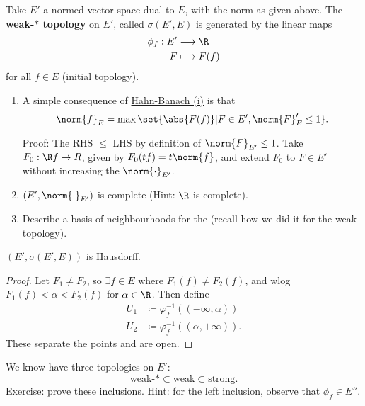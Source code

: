\documentclass[twoside]{article}
\begin{document}
\begin{defi}
    Take $E'$ a normed vector space dual to $E$, with the norm as given above.
    The \textbf{weak-$*$ topology} on $E'$, called $\sigma(E', E)$ is generated by the linear maps
    \begin{align*}\phi_f: E' &\longrightarrow \R \\ F &\longmapsto F(f)\end{align*}
    for all $f \in E$ (\hyperlink{def:initTop}{initial topology}).
\end{defi}
\begin{ex}\leavevmode
    \begin{enumerate}[label=(\arabic*)]
        \item A simple consequence of \hyperlink{thm:hb}{Hahn-Banach (i)} is that
            \begin{equation*}
                \norm{f}_E = \max\set{\abs{F(f)} | F \in E', \norm{F}_E' \leq 1}.
            \end{equation*}

            Proof: The RHS $\leq$ LHS by definition of $\norm{F}_{E'} \leq 1$.
            Take $F_0: \R f \to R$, given by $F_0(tf) = t \norm{f}$, and extend $F_0$ to $F \in E'$ without increasing the $\norm{\cdot}_{E'}$.
        \item $(E', \norm{\cdot}_{E'})$ is complete (Hint: $\R$ is complete).
        \item Describe a basis of neighbourhoods for the (recall how we did it for the weak topology).
    \end{enumerate}
\end{ex}
\begin{prop}
    $(E', \sigma(E', E))$ is Hausdorff.
\end{prop}
\begin{proof}
    Let $F_1 \neq F_2$, so $\exists f \in E$ where $F_1(f) \neq F_2(f)$, and wlog $F_1(f) < \alpha < F_2(f)$ for $\alpha \in \R$.
    Then define
    \begin{align*}
        U_1 &\coloneqq \varphi_f^{-1}((-\infty, \alpha)) \\
        U_2 &\coloneqq \varphi_f^{-1}((\alpha, +\infty)).
    \end{align*}
    These separate the points and are open.
\end{proof}
\begin{remark}
    We know have three topologies on $E'$:
    \begin{equation*}
        \text{weak-}* \subset \text{weak} \subset \text{strong}.
    \end{equation*}
    Exercise: prove these inclusions. Hint: for the left inclusion, observe that $\phi_f \in E''$.
\end{remark}
\end{document}
